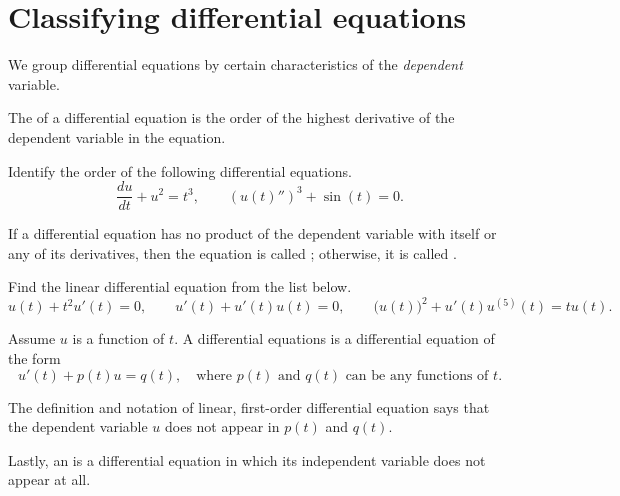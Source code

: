 \documentclass[../main.tex]{subfiles}
\begin{document}
 \section{Classifying differential equations}

We group differential equations by certain characteristics of the \emph{dependent} variable.

\begin{definition}[order]
The  of a differential equation is the order of the highest derivative of the dependent variable in the equation.
\end{definition}
\begin{example}
  Identify the order of the following differential equations.
  \[
    \frac{du}{dt} + u^{2} = t^{3}, 
    \qquad
    \left(u(t)''\right)^{3} + \sin(t) = 0.
  \]
\end{example}

\begin{definition}
  If a differential equation has no product of the dependent variable with itself or any of its derivatives, then the equation is called ; otherwise, it is called . 
\end{definition}
\begin{example}
  Find the linear differential equation from the list below.
  \[
    u(t) + t^{2} u'(t) = 0,
    \qquad
    u'(t) + u'(t) u(t) = 0,
    \qquad
    \big(u(t)\big)^{2} + u'(t) u^{(5)}(t) = t u(t).
  \]
\end{example}

\begin{definition}
  Assume \(u\) is a function of \(t\). A  differential equations is a differential equation of the form
  \[
    u'(t) + p(t) u = q(t), \quad\text{where \(p(t)\) and \(q(t)\) can be any functions of \(t\)}.
  \]
\end{definition}

\faExclamationTriangle{} The definition and notation of linear, first-order differential equation says that the dependent variable \(u\) does not appear in \(p(t)\) and \(q(t)\).

Lastly, an  is a differential equation in which its independent variable does not appear at all. 
\end{document}
